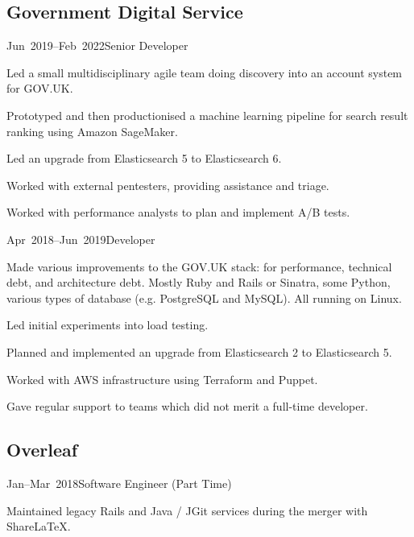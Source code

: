 \documentclass[a4paper]{barrucadu-cv}
\newcommand{\range}[2]{#1–#2}
\begin{document}
\subsection{Government Digital Service}

\begin{cventry}{\range{Jun~2019}{Feb~2022}}{Senior Developer}
  \begin{tightitemize}
  \item Led a small multidisciplinary agile team doing discovery into an account system for GOV.UK.
  \item Prototyped and then productionised a machine learning pipeline for search result ranking using Amazon SageMaker.
  \item Led an upgrade from Elasticsearch 5 to Elasticsearch 6.
  \item Worked with external pentesters, providing assistance and triage.
  \item Worked with performance analysts to plan and implement A/B tests.
  \end{tightitemize}
\end{cventry}

\begin{cventry}{\range{Apr~2018}{Jun~2019}}{Developer}
  \begin{tightitemize}
  \item Made various improvements to the GOV.UK stack: for performance, technical debt, and architecture debt.  Mostly Ruby and Rails or Sinatra, some Python, various types of database (e.g. PostgreSQL and MySQL).  All running on Linux.
  \item Led initial experiments into load testing.
  \item Planned and implemented an upgrade from Elasticsearch 2 to Elasticsearch 5.
  \item Worked with AWS infrastructure using Terraform and Puppet.
  \item Gave regular support to teams which did not merit a full-time developer.
  \end{tightitemize}
\end{cventry}

\subsection{Overleaf}

\begin{cventry}{\range{Jan}{Mar}~2018}{Software Engineer (Part Time)}
  \begin{tightitemize}
  \item Maintained legacy Rails and Java / JGit services during the merger with ShareLaTeX.
  \end{tightitemize}
\end{cventry}
\end{document}
